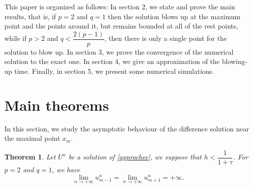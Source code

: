 \documentclass[a4paper,12pt,english,reqno]{smfart}
\newtheorem{th1}{Theorem}[section]
\begin{document}
	This paper is organized as follows: In section 2, we state and prove the main results, that is, if $p=2$ and $q=1$ then the solution blows up at the maximum point and the points around it, but remains bounded at all of the rest points, while if $p>2$ and $q<\dfrac{2(p-1)}{p}$, then there is only a single point for the solution to blow up. In section 3, we prove the convergence of the numerical solution to the exact one. In section 4, we give an approximation of the blowing-up time. Finally, in section 5, we present some numerical simulations.
	\section{Main theorems}
	In this section, we study the asymptotic behaviour of the difference solution near the maximal point $x_{m}.$
	\begin{th1}
		Let $U^{n}$ be a solution of \eqref{approchee}, we suppose that $h<\dfrac{1}{1+\tau}$. For $p=2$ and $q=1$, we have 
		\begin{equation*}
		\lim_{n\rightarrow +\infty} u_{m-1}^{n}=\lim_{n\rightarrow +\infty} u_{m+1}^{n}=+\infty.
		\end{equation*}
	\end{th1}
\end{document}
